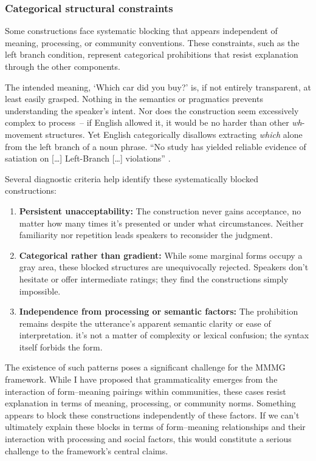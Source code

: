 \documentclass[12pt,letterpaper]{article}
\begin{document}
\subsubsection{Categorical structural constraints}\label{sec:categorical-constraints}

Some constructions face systematic blocking that appears independent of meaning, processing, or community conventions. These constraints, such as the left branch condition, represent categorical prohibitions that resist explanation through the other components.

\label{ex:LBC-cat}
\z

The intended meaning, `Which car did you buy?' is, if not entirely transparent, at least easily grasped. Nothing in the semantics or pragmatics prevents understanding the speaker's intent. Nor does the construction seem excessively complex to process~-- if English allowed it, it would be no harder than other \textit{wh}-movement structures. Yet English categorically disallows extracting \textit{which} alone from the left branch of a noun phrase. ``No study has yielded reliable evidence of satiation on [\dots] Left-Branch [\dots] violations'' \autocite[22]{Snyder2022}.

Several diagnostic criteria help identify these systematically blocked constructions:
\begin{enumerate}
\item \textbf{Persistent unacceptability:} The construction never gains acceptance, no matter how many times it's presented or under what circumstances. Neither familiarity nor repetition leads speakers to reconsider the judgment.
\item \textbf{Categorical rather than gradient:} While some marginal forms occupy a gray area, these blocked structures are unequivocally rejected. Speakers don't hesitate or offer intermediate ratings; they find the constructions simply impossible.
\item \textbf{Independence from processing or semantic factors:} The prohibition remains despite the utterance's apparent semantic clarity or ease of interpretation. it's not a matter of complexity or lexical confusion; the syntax itself forbids the form.
\end{enumerate}

The existence of such patterns poses a significant challenge for the MMMG framework. While I have proposed that grammaticality emerges from the interaction of form--meaning pairings within communities, these cases resist explanation in terms of meaning, processing, or community norms. Something appears to block these constructions independently of these factors. If we can't ultimately explain these blocks in terms of form--meaning relationships and their interaction with processing and social factors, this would constitute a serious challenge to the framework's central claims.
\end{document}
